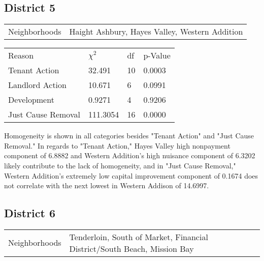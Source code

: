 \documentclass[]{article}
\begin{document}
\subsection{District 5}

\begin{table}[!h]
	\centering
	\begin{tabular}{l | l}
		Neighborhoods & Haight Ashbury, Hayes Valley, Western Addition \\
	\end{tabular}
\end{table}
\FloatBarrier

\begin {table}[!h]
\centering
\begin{tabular}{l | l | l | l}
	
	Reason				&  $\chi ^{2}$ & df & p-Value \\
	Tenant Action 		   &  32.491   &  10 & 0.0003 \\
	Landlord Action	       &  10.671  & 6  & 0.0991 \\
	Development			   &  0.9271  &  4 & 0.9206 \\
	Just Cause Removal	   &  111.3054  & 16  & 0.0000 \\
\end{tabular} \newline
\end{table}
\FloatBarrier

Homogeneity is shown in all categories besides "Tenant Action" and "Just Cause Removal." In regards to "Tenant Action," Hayes Valley high nonpayment component of 6.8882 and Western Addition's high nuisance component of 6.3202 likely contribute to the lack of homogeneity, and in "Just Cause Removal," Western Addition's extremely low capital improvement component of 0.1674 does not correlate with the next lowest in Western Addison of 14.6997.

\subsection{District 6}


\begin{table}[!h]
	\centering
	\begin{tabular}{l | l}
		Neighborhoods & Tenderloin, South of Market, Financial District/South Beach, Mission Bay  \\
	\end{tabular}
\end{table}
\FloatBarrier
\end{document}
